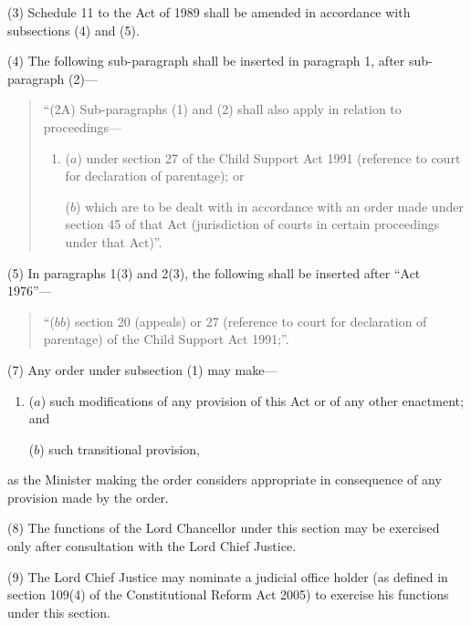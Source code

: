 \documentclass[12pt,a4paper]{article}
\begin{document}
(3) Schedule 11 to the Act of 1989 shall be amended in accordance with subsections (4)  and (5).

(4) The following sub-paragraph shall be inserted in paragraph 1, after sub-paragraph (2)—
\begin{quotation}
“(2A) Sub-paragraphs (1)  and (2)  shall also apply in relation to proceedings—
\begin{enumerate}\item[]
($a$) under section 27 of the Child Support Act 1991 (reference to court for declaration of parentage); or

($b$) which are to be dealt with in accordance with an order made under section 45 of that Act (jurisdiction of courts in certain proceedings under that Act)”.
\end{enumerate}
\end{quotation}

(5) In paragraphs 1(3)  and 2(3), the following shall be inserted after “Act 1976”—
\begin{quotation}
“($bb$) section 20 (appeals) or 27 (reference to court for declaration of parentage) of the Child Support Act 1991;”.
\end{quotation}


(7) Any order under subsection (1)  
may make—
\begin{enumerate}\item[]
($a$) such modifications of any provision of this Act or of any other enactment; and

($b$) such transitional provision,
\end{enumerate}
as the Minister making the order considers appropriate in consequence of any provision made by the order.

(8) The functions of the Lord Chancellor under this section may be exercised only after consultation with the Lord Chief Justice.

(9) The Lord Chief Justice may nominate a judicial office holder (as defined in section 109(4) of the Constitutional Reform Act 2005) to exercise his functions under this section.
\end{document}
